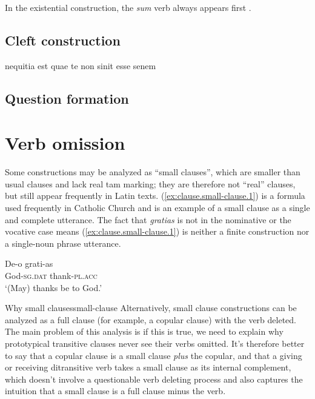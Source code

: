 \documentclass[a4paper, oneside, 12pt]{report}
\newcommand*{\citepage}[1]{p.~{#1}}
\newcommand{\form}[1]{\emph{#1}}
\newcommand*{\category}[1]{\textsc{#1}}
\newcommand{\translate}[1]{`#1'}
\begin{document}
In the existential construction,
the \form{sum} verb always appears first
\citep[\citepage{396}]{allen1903allen}.

\section{Cleft construction}

nequitia est quae te non sinit esse senem

\section{Question formation}

\chapter{Verb omission}


Some constructions may be analyzed as ``small clauses'', 
which are smaller than usual clauses 
and lack real \acs{tam} marking;
they are therefore not ``real'' clauses, 
but still appear frequently in Latin texts.
(\ref{ex:clause.small-clause.1}) is a formula used frequently in Catholic Church 
and is an example of a small clause 
as a single and complete utterance.
The fact that \form{gratias} is not in the nominative or the vocative case 
means (\ref{ex:clause.small-clause.1}) is 
neither a finite construction nor a single-noun phrase utterance.


\begin{exe}
    \ex \gll De-o grati-as \\
    God-\category{sg}.\category{dat} thank-\category{pl}.\category{acc} \\
    \glt \translate{(May) thanks be to God.}
    \label{ex:clause.small-clause.1}
\end{exe}

\begin{infobox}{Why small clauses}{small-clause}
    Alternatively, small clause constructions can be analyzed 
    as a full clause (for example, a copular clause) with the verb deleted.
    The main problem of this analysis is if this is true, 
    we need to explain why prototypical transitive clauses 
    never see their verbs omitted.
    It's therefore better to say 
    that a copular clause is a small clause \emph{plus} the copular,
    and that a giving or receiving ditransitive verb 
    takes a small clause as its internal complement,
    which doesn't involve a questionable verb deleting process
    and also captures the intuition that 
    a small clause is a full clause minus the verb.
\end{infobox}
\end{document}
